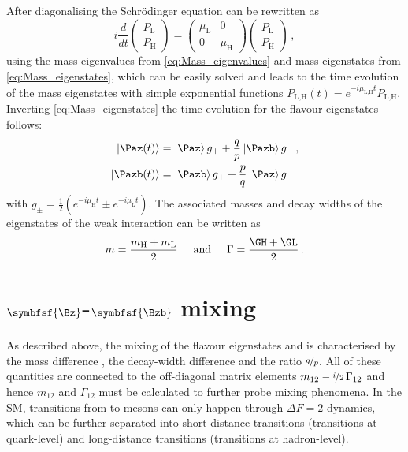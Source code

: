 After diagonalising the Schrödinger equation can be rewritten as
\begin{equation}
i\frac{d}{dt}\begin{pmatrix} P_\text{L} \\ P_\text{H} \end{pmatrix} = \begin{pmatrix} \mu_\text{L} & 0 \\ 0 & \mu_\text{H} \end{pmatrix}\begin{pmatrix} P_\text{L} \\ P_\text{H} \end{pmatrix}\,,
\end{equation}
using the mass eigenvalues from \cref{eq:Mass_eigenvalues} and mass eigenstates from \cref{eq:Mass_eigenstates}, which can be easily solved and leads to the time evolution of the mass eigenstates with simple exponential functions $P_\text{L,H}(t)=e^{-i\mu_\text{L,H}t}P_\text{L,H}$.
Inverting \cref{eq:Mass_eigenstates} the time evolution for the flavour eigenstates follows:
\begin{equation}
\begin{split}
\left|\Paz\!\left(t\right)\right>&=\left|\Paz\right>g_++\frac{q}{p}\left|\Pazb\right>g_-\,,\\
\left|\Pazb\!\left(t\right)\right>&=\left|\Pazb\right>g_++\frac{p}{q}\left|\Paz\right>g_-\label{eq:timeEvolution}
\end{split}
\end{equation}
with $g_\pm=\frac{1}{2}\left(e^{-i\mu_\text{H}t}\pm e^{-i\mu_\text{L}t}\right)$.
The associated masses and decay widths of the eigenstates of the weak interaction can be written as
\begin{equation}
m=\frac{m_\text{H}+m_\text{L}}{2}\hspace{0.5cm}\text{and}\hspace{0.5cm}\Gamma=\frac{\GH+\GL}{2}\,.
\end{equation}

\section[head={\Bz-\Bzb mixing},tocentry={\Bz-\Bzb mixing}]{$\symbfsf{\Bz}$-$\symbfsf{\Bzb}$ mixing}
\label{sec:BBbarMixing}

As described above, the mixing of the flavour eigenstates \Bq and \Bqb is characterised by the mass difference \dm, the decay-width difference \DG and the ratio $\nicefrac{q}{p}$.
All of these quantities are connected to the off-diagonal matrix elements $m_{12}-\nicefrac{i}{2}\,\Gamma_{12}$ and hence $m_{12}$ and $\Gamma_{12}$ must be calculated to further probe mixing phenomena.
In the \ac{SM}, transitions from \Bq to \Bqb mesons can only happen through $\Delta F=2$ dynamics, which can be further separated into short-distance transitions (transitions at quark-level) and long-distance transitions (transitions at hadron-level).

